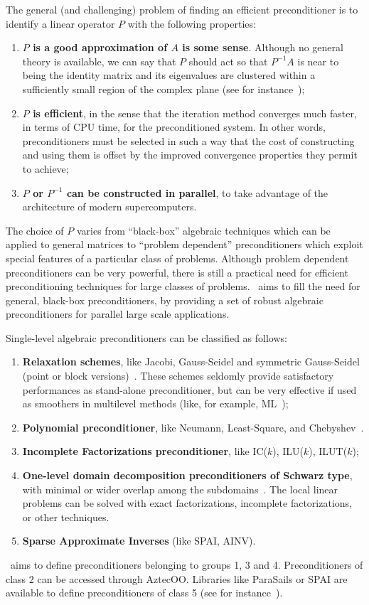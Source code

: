 The general (and challenging) problem of finding an efficient
preconditioner is to identify a linear operator $P$ with the following
properties:
\begin{enumerate}
\item {\bf $P$ is a good approximation of $A$ is some sense}. Although no
  general theory is available, we can say that $P$ should act so that
  $P^{-1} A$ is near to being the identity matrix and its eigenvalues
  are clustered within a sufficiently small region of the complex plane 
  (see for instance~\cite{greenbaum97iterative});
\item {\bf $P$ is efficient}, in the sense that the iteration method converges
  much faster, in terms of CPU time, for the preconditioned system.  In
  other words, preconditioners must be selected in such a way that the
  cost of constructing and using them is offset by the improved
  convergence properties they permit to achieve;
\item {\bf $P$ or $P^{-1}$ can be constructed in parallel}, to take advantage of the architecture of modern supercomputers.
\end{enumerate}

The choice of $P$ varies from ``black-box'' algebraic techniques which
can be applied to general matrices to ``problem dependent''
preconditioners which exploit special features of a particular class
of problems. Although problem dependent preconditioners can be very
powerful, there is still a practical need for efficient
preconditioning techniques for large classes of problems. \ifpack\ aims to
fill the need for general, black-box preconditioners, by providing a set of
robust algebraic preconditioners for parallel large scale applications.

Single-level algebraic preconditioners can be classified as follows:
\begin{enumerate}
\item {\bf Relaxation schemes},
  like Jacobi, Gauss-Seidel and symmetric Gauss-Seidel (point or block versions)~\cite{varga00matrix}.
  These schemes seldomly provide satisfactory performances as stand-alone
  preconditioner, but can be very effective if used as smoothers in
  multilevel methods (like, for example, ML~\cite{ml-guide});
\item {\bf Polynomial preconditioner}, like Neumann, Least-Square, and
Chebyshev~\cite{saad96iterative}.
\item {\bf Incomplete Factorizations preconditioner}, like IC($k$), ILU($k$), 
  ILUT($k$);
\item {\bf One-level domain decomposition preconditioners of Schwarz type},
  with minimal or wider overlap among the subdomains~\cite{smith96parallel,
    QV2}. The local linear problems
  can be solved with exact factorizations, incomplete factorizations, or
  other techniques.
\item {\bf Sparse Approximate Inverses} (like SPAI, AINV).
\end{enumerate}
\ifpack\ aims to define preconditioners belonging to groups 1, 3 and 4.
Preconditioners of class 2 can be accessed through AztecOO. Libraries like
ParaSails or SPAI are available to define preconditioners of class 5 
(see for instance~\cite{grote97parallel,benzi98sparse}).

